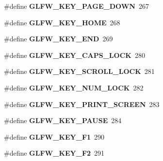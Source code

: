 \begin{DoxyCompactItemize}
\item 
\mbox{\label{group__keys_gaee0a8fa442001cc2147812f84b59041c}} 
\#define {\bfseries G\+L\+F\+W\+\_\+\+K\+E\+Y\+\_\+\+P\+A\+G\+E\+\_\+\+D\+O\+WN}~267
\item 
\mbox{\label{group__keys_ga41452c7287195d481e43207318c126a7}} 
\#define {\bfseries G\+L\+F\+W\+\_\+\+K\+E\+Y\+\_\+\+H\+O\+ME}~268
\item 
\mbox{\label{group__keys_ga86587ea1df19a65978d3e3b8439bedd9}} 
\#define {\bfseries G\+L\+F\+W\+\_\+\+K\+E\+Y\+\_\+\+E\+ND}~269
\item 
\mbox{\label{group__keys_ga92c1d2c9d63485f3d70f94f688d48672}} 
\#define {\bfseries G\+L\+F\+W\+\_\+\+K\+E\+Y\+\_\+\+C\+A\+P\+S\+\_\+\+L\+O\+CK}~280
\item 
\mbox{\label{group__keys_gaf622b63b9537f7084c2ab649b8365630}} 
\#define {\bfseries G\+L\+F\+W\+\_\+\+K\+E\+Y\+\_\+\+S\+C\+R\+O\+L\+L\+\_\+\+L\+O\+CK}~281
\item 
\mbox{\label{group__keys_ga3946edc362aeff213b2be6304296cf43}} 
\#define {\bfseries G\+L\+F\+W\+\_\+\+K\+E\+Y\+\_\+\+N\+U\+M\+\_\+\+L\+O\+CK}~282
\item 
\mbox{\label{group__keys_gaf964c2e65e97d0cf785a5636ee8df642}} 
\#define {\bfseries G\+L\+F\+W\+\_\+\+K\+E\+Y\+\_\+\+P\+R\+I\+N\+T\+\_\+\+S\+C\+R\+E\+EN}~283
\item 
\mbox{\label{group__keys_ga8116b9692d87382afb5849b6d8907f18}} 
\#define {\bfseries G\+L\+F\+W\+\_\+\+K\+E\+Y\+\_\+\+P\+A\+U\+SE}~284
\item 
\mbox{\label{group__keys_gafb8d66c573acf22e364049477dcbea30}} 
\#define {\bfseries G\+L\+F\+W\+\_\+\+K\+E\+Y\+\_\+\+F1}~290
\item 
\mbox{\label{group__keys_ga0900750aff94889b940f5e428c07daee}} 
\#define {\bfseries G\+L\+F\+W\+\_\+\+K\+E\+Y\+\_\+\+F2}~291
\item 
\mbox{\label{group__keys_gaed7cd729c0147a551bb8b7bb36c17015}} 

\end{DoxyCompactItemize}
